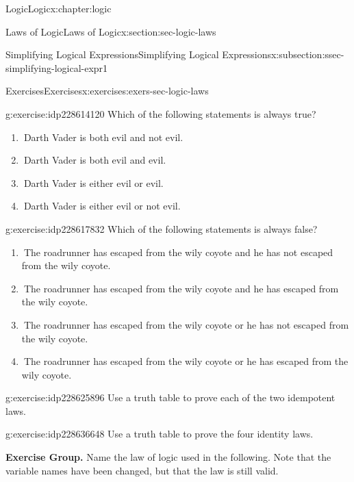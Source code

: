 \documentclass[twoside,10pt,]{book}
\numberwithin{equation}{section}
\begin{document}
\begin{chapterptx}{Logic}{}{Logic}{}{}{x:chapter:logic}
\begin{sectionptx}{Laws of Logic}{}{Laws of Logic}{}{}{x:section:sec-logic-laws}
\begin{subsectionptx}{Simplifying Logical Expressions}{}{Simplifying Logical Expressions}{}{}{x:subsection:ssec-simplifying-logical-expr1}
\end{subsectionptx}
%
%
\typeout{************************************************}
\typeout{************************************************}
%
\begin{exercises-subsection}{Exercises}{}{Exercises}{}{}{x:exercises:exers-sec-logic-laws}
\begin{divisionexercise}{1}{}{}{g:exercise:idp228614120}%
Which of the following statements is always true? %
\begin{enumerate}[label=(\alph*)]
\item{}\(\ \)Darth Vader is both evil and not evil.%
\item{}\(\ \)Darth Vader is both evil and evil.%
\item{}\(\ \)Darth Vader is either evil or evil.%
\item{}\(\ \)Darth Vader is either evil or not evil.%
\end{enumerate}
\end{divisionexercise}%
\begin{divisionexercise}{2}{}{}{g:exercise:idp228617832}%
Which of the following statements is always false? %
\begin{enumerate}[label=(\alph*)]
\item{}\(\ \)The roadrunner has escaped from the wily coyote and he has not escaped from the wily coyote.%
\item{}\(\ \)The roadrunner has escaped from the wily coyote and he has escaped from the wily coyote.%
\item{}\(\ \)The roadrunner has escaped from the wily coyote or he has not escaped from the wily coyote.%
\item{}\(\ \)The roadrunner has escaped from the wily coyote or he has escaped from the wily coyote.%
\end{enumerate}
\end{divisionexercise}%
\begin{divisionexercise}{3}{}{}{g:exercise:idp228625896}%
Use a truth table to prove each of the two idempotent laws.\end{divisionexercise}%
\begin{divisionexercise}{4}{}{}{g:exercise:idp228636648}%
Use a truth table to prove the four identity laws.\end{divisionexercise}%
\par\medskip\noindent%
\textbf{Exercise Group.}\space\space%
Name the law of logic used in the following.  Note that the variable names have been changed, but that the law is still valid.\begin{exercisegroup}

\end{exercisegroup}
\end{exercises-subsection}
\end{sectionptx}
\end{chapterptx}
\end{document}
